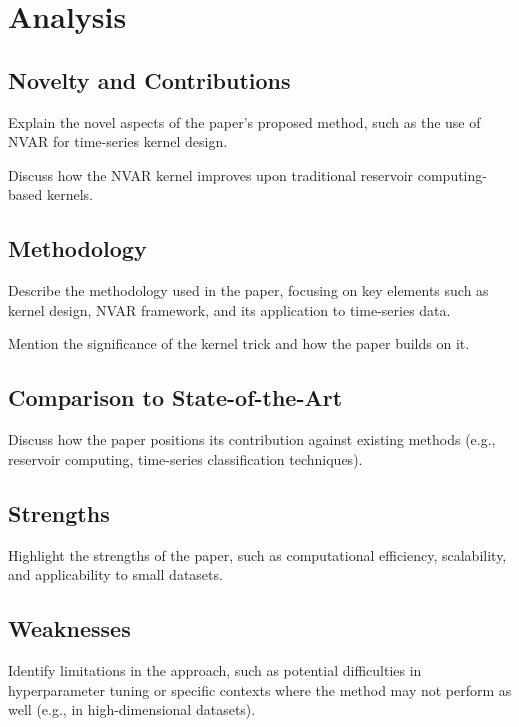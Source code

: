 \chapter{Analysis} \label{chap:analysis}

\section{Novelty and Contributions}

Explain the novel aspects of the paper's proposed method, such as the use of NVAR for time-series kernel design.

Discuss how the NVAR kernel improves upon traditional reservoir computing-based kernels.

\section{Methodology}

Describe the methodology used in the paper, focusing on key elements such as kernel design, NVAR framework, and its application to time-series data.

Mention the significance of the kernel trick and how the paper builds on it.

\section{Comparison to State-of-the-Art}

Discuss how the paper positions its contribution against existing methods (e.g., reservoir computing, time-series classification techniques).

\section{Strengths}

Highlight the strengths of the paper, such as computational efficiency, scalability, and applicability to small datasets.

\section{Weaknesses}

Identify limitations in the approach, such as potential difficulties in hyperparameter tuning or specific contexts where the method may not perform as well (e.g., in high-dimensional datasets).
